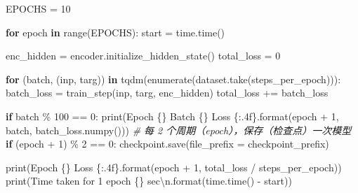 \documentclass[
]{article}
\newenvironment{Shaded}{}{}
\newcommand{\BuiltInTok}[1]{#1}
\newcommand{\CharTok}[1]{\textcolor[rgb]{0.25,0.44,0.63}{#1}}
\newcommand{\CommentTok}[1]{\textcolor[rgb]{0.38,0.63,0.69}{\textit{#1}}}
\newcommand{\ControlFlowTok}[1]{\textcolor[rgb]{0.00,0.44,0.13}{\textbf{#1}}}
\newcommand{\DecValTok}[1]{\textcolor[rgb]{0.25,0.63,0.44}{#1}}
\newcommand{\KeywordTok}[1]{\textcolor[rgb]{0.00,0.44,0.13}{\textbf{#1}}}
\newcommand{\NormalTok}[1]{#1}
\newcommand{\OperatorTok}[1]{\textcolor[rgb]{0.40,0.40,0.40}{#1}}
\newcommand{\SpecialCharTok}[1]{\textcolor[rgb]{0.25,0.44,0.63}{#1}}
\newcommand{\StringTok}[1]{\textcolor[rgb]{0.25,0.44,0.63}{#1}}
\begin{document}
\begin{Shaded}
\begin{Highlighting}[]

\NormalTok{EPOCHS }\OperatorTok{=} \DecValTok{10}

\ControlFlowTok{for}\NormalTok{ epoch }\KeywordTok{in} \BuiltInTok{range}\NormalTok{(EPOCHS):}
\NormalTok{    start }\OperatorTok{=}\NormalTok{ time.time()}

\NormalTok{    enc\_hidden }\OperatorTok{=}\NormalTok{ encoder.initialize\_hidden\_state()}
\NormalTok{    total\_loss }\OperatorTok{=} \DecValTok{0}

    \ControlFlowTok{for}\NormalTok{ (batch, (inp, targ)) }\KeywordTok{in}\NormalTok{ tqdm(}\BuiltInTok{enumerate}\NormalTok{(dataset.take(steps\_per\_epoch))):}
\NormalTok{        batch\_loss }\OperatorTok{=}\NormalTok{ train\_step(inp, targ, enc\_hidden)}
\NormalTok{        total\_loss }\OperatorTok{+=}\NormalTok{ batch\_loss}

        \ControlFlowTok{if}\NormalTok{ batch }\OperatorTok{\%} \DecValTok{100} \OperatorTok{==} \DecValTok{0}\NormalTok{:}
            \BuiltInTok{print}\NormalTok{(}\StringTok{\textquotesingle{}Epoch }\SpecialCharTok{\{\}}\StringTok{ Batch }\SpecialCharTok{\{\}}\StringTok{ Loss }\SpecialCharTok{\{:.4f\}}\StringTok{\textquotesingle{}}\NormalTok{.}\BuiltInTok{format}\NormalTok{(epoch }\OperatorTok{+} \DecValTok{1}\NormalTok{,}
\NormalTok{                                                     batch,}
\NormalTok{                                                     batch\_loss.numpy()))}
  \CommentTok{\# 每 2 个周期（epoch），保存（检查点）一次模型}
    \ControlFlowTok{if}\NormalTok{ (epoch }\OperatorTok{+} \DecValTok{1}\NormalTok{) }\OperatorTok{\%} \DecValTok{2} \OperatorTok{==} \DecValTok{0}\NormalTok{:}
\NormalTok{        checkpoint.save(file\_prefix }\OperatorTok{=}\NormalTok{ checkpoint\_prefix)}

    \BuiltInTok{print}\NormalTok{(}\StringTok{\textquotesingle{}Epoch }\SpecialCharTok{\{\}}\StringTok{ Loss }\SpecialCharTok{\{:.4f\}}\StringTok{\textquotesingle{}}\NormalTok{.}\BuiltInTok{format}\NormalTok{(epoch }\OperatorTok{+} \DecValTok{1}\NormalTok{,}
\NormalTok{                                      total\_loss }\OperatorTok{/}\NormalTok{ steps\_per\_epoch))}
    \BuiltInTok{print}\NormalTok{(}\StringTok{\textquotesingle{}Time taken for 1 epoch }\SpecialCharTok{\{\}}\StringTok{ sec}\CharTok{\textbackslash{}n}\StringTok{\textquotesingle{}}\NormalTok{.}\BuiltInTok{format}\NormalTok{(time.time() }\OperatorTok{{-}}\NormalTok{ start))}

\end{Highlighting}
\end{Shaded}
\end{document}
